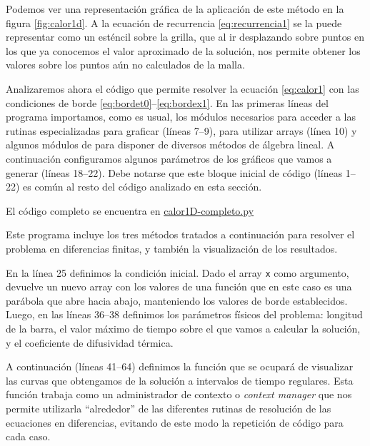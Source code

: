 Podemos ver una representación gráfica de la aplicación de este método en la figura \ref{fig:calor1d}. A la ecuación de recurrencia \eqref{eq:recurrencia1} se la puede representar como un esténcil sobre la grilla, que al ir desplazando sobre puntos en los que ya conocemos el valor aproximado de la solución, nos permite obtener los valores sobre los puntos aún no calculados de la malla.

Analizaremos ahora el código que permite resolver la ecuación \eqref{eq:calor1} con las condiciones de borde \eqref{eq:bordet0}--\eqref{eq:bordex1}. En las primeras líneas del programa importamos, como es usual, los módulos necesarios para acceder a las rutinas especializadas para graficar (líneas 7--9),  para utilizar arrays (línea 10) y algunos módulos de  para disponer de diversos métodos de álgebra lineal. A continuación configuramos algunos parámetros de los gráficos que vamos a generar (líneas 18--22). Debe notarse que este bloque inicial de código (líneas 1--22) es común al resto del código analizado en esta sección.

\begin{github}
 El código completo se encuentra en \href{https://github.com/algunaurl/calor1D-completo.py}{calor1D-completo.py}
 
 \noindent Este programa incluye los tres métodos tratados a continuación para resolver el problema en diferencias finitas, y también la visualización de los resultados.
\end{github}


En la línea 25 definimos la condición inicial. Dado el array \verb|x| como argumento, devuelve un nuevo array con los valores de una función que en este caso es una parábola que abre hacia abajo, manteniendo los valores de borde establecidos. Luego, en las líneas 36--38 definimos los parámetros físicos del problema: longitud de la barra, el valor máximo de tiempo sobre el que vamos a calcular la solución, y el coeficiente de difusividad térmica.

A continuación (líneas 41--64) definimos la función  que se ocupará de visualizar las curvas que obtengamos de la solución a intervalos de tiempo regulares. Esta función trabaja como un administrador de contexto o \textit{context manager} que nos permite utilizarla ``alrededor'' de las diferentes rutinas de resolución de las ecuaciones en diferencias, evitando de este modo la repetición de código para cada caso. 

